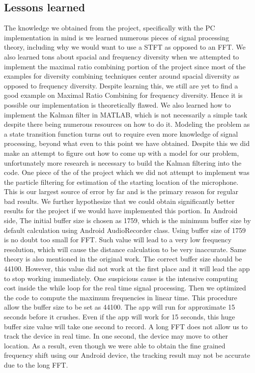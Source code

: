 \documentclass{acm_proc_article-sp}
\begin{document}
\subsection{Lessons learned}
The knowledge we obtained from the project, specifically with the PC implementation in mind is we learned numerous pieces of signal processing theory, including why we would want to use a STFT as opposed to an FFT. We also learned tons about spacial and frequency diversity when we attempted to implement the maximal ratio combining portion of the project since most of the examples for diversity combining techniques center around spacial diversity as opposed to frequency diversity. Despite learning this, we still are yet to find a good example on Maximal Ratio Combining  for frequency diversity. Hence it is possible our implementation is theoretically flawed. We also learned how to implement the Kalman filter in MATLAB, which is not necessarily a simple task despite there being numerous resources on how to do it. Modeling the problem as a state transition function turns out to require even more knowledge of signal processing, beyond what even to this point we have obtained. Despite this we did make an attempt to figure out how to come up with a model for our problem, unfortunately more research is necessary to build the Kalman filtering into the code. One piece of the of the project which we did not attempt to implement was the particle filtering for estimation of the starting location of the microphone. This is our largest source of error by far and is the primary reason for regular bad results. We further hypothesize that we could obtain significantly better results for the project if we would have implemented this portion.
In Android side, The initial buffer size is chosen as 1759, which is the minimum
buffer size by default calculation using Android AudioRecorder class. 
Using buffer size of 1759 is no doubt too small for FFT. Such value
will lead to a very low frequency resolution, which will cause the distance calculation
to be very inaccurate. Same theory is also mentioned in the original work. The correct
buffer size should be 44100. However, this value did not work at the first place and 
it will lead the app to stop working immediately. One suspicious cause is the intensive
computing cost inside the while loop for the real time signal processing. Then we 
optimized the code to compute the maximum frequencies in linear time. This procedure 
allow the buffer size to be set as 44100. The app will run for approximate 15 seconds
before it crushes.
Even if the app will work for 15 seconds, this huge buffer size value will take one
second to record. A long FFT does not allow us to track the device in real time. In one
second, the device may move to other location. As a result, even though we were able to
obtain the fine grained frequency shift using our Android device, the tracking result 
may not be accurate due to the long FFT.
\end{document}
